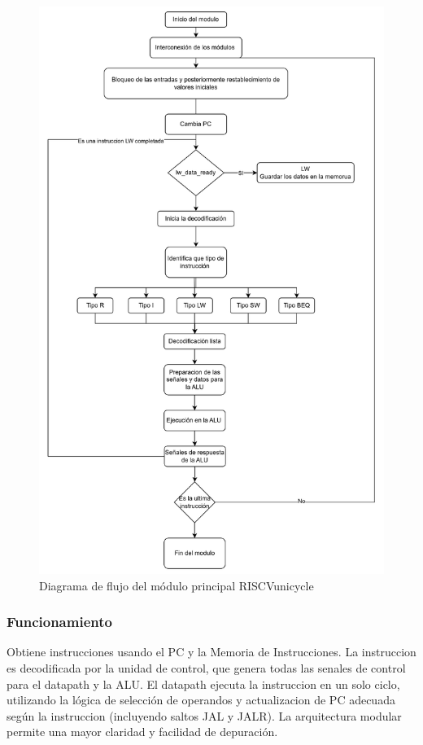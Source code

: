 \documentclass[conference]{IEEEtran}
\begin{document}
\begin{figure}[h!]
    \centering
    \includegraphics[width=0.95\linewidth]{Diagrama de flujo del modulo RISCVunicycle.png}
    \caption{Diagrama de flujo del módulo principal RISCVunicycle}
    \label{fig:diagrama-flujo-riscvunicycle}
\end{figure}

\subsubsection{Funcionamiento}
Obtiene instrucciones usando el PC y la Memoria de Instrucciones. La instruccion es decodificada por la unidad de control, que genera todas las senales de control para el datapath y la ALU. El datapath ejecuta la instruccion en un solo ciclo, utilizando la lógica de selección de operandos y actualizacion de PC adecuada según la instruccion (incluyendo saltos JAL y JALR). La arquitectura modular permite una mayor claridad y facilidad de depuración.
\end{document}
